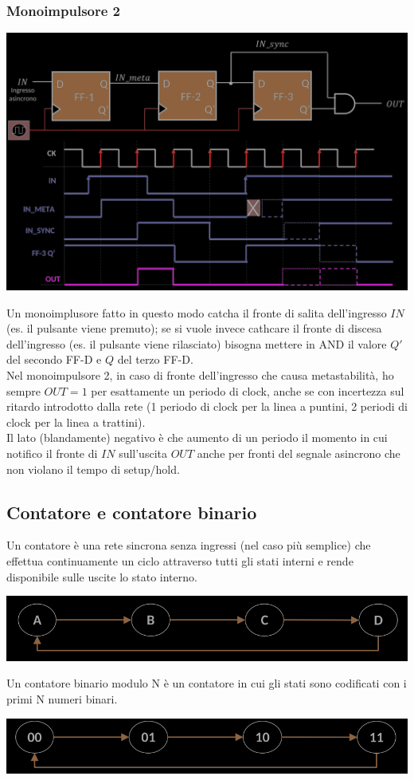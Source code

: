 \documentclass{article}
\begin{document}
\subsubsection*{Monoimpulsore 2}
\begin{center}
    \includegraphics[scale=0.35]{monoimpulsore 2.png}
\end{center}
Un monoimplusore fatto in questo modo catcha il fronte di salita dell'ingresso $IN$ (es. il pulsante viene premuto); se si vuole invece cathcare il fronte di discesa dell'ingresso (es. il pulsante viene rilasciato) bisogna mettere in AND il valore $Q'$ del secondo FF-D e $Q$ del terzo FF-D.\\
Nel monoimpulsore 2, in caso di fronte dell’ingresso che causa metastabilità, ho sempre $OUT=1$ per esattamente un periodo di clock, anche se con incertezza sul ritardo introdotto dalla rete (1 periodo di clock per la linea a puntini, 2 periodi di clock per la linea a trattini).\\
Il lato (blandamente) negativo è che aumento di un periodo il momento in cui notifico il fronte di $IN$ sull’uscita $OUT$ anche per fronti del segnale asincrono che non violano il tempo di setup/hold.
\subsection{Contatore e contatore binario}
Un contatore è una rete sincrona senza ingressi (nel caso più semplice) che effettua continuamente un ciclo attraverso tutti gli stati interni e rende disponibile sulle uscite lo stato interno.
\begin{center}
    \includegraphics[scale=0.4]{contatore.png}
\end{center}
Un contatore binario modulo N è un contatore in cui gli stati sono codificati con i primi N numeri binari.
\begin{center}
    \includegraphics[scale=0.4]{contatore binario.png}
\end{center}
\end{document}
